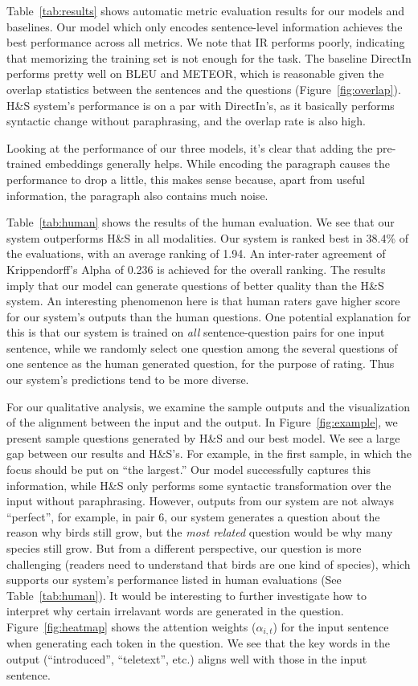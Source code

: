 \documentclass[11pt,a4paper]{article}
\begin{document}
Table~\ref{tab:results} shows automatic metric evaluation results for our models and baselines. Our model which only encodes sentence-level information achieves the best performance across all metrics. We note that IR performs poorly, indicating that memorizing the training set is not enough for the task. The baseline DirectIn performs pretty well on BLEU and METEOR, which is reasonable given the overlap statistics between the sentences and the questions (Figure~\ref{fig:overlap}). H\&S system's performance is on a par with DirectIn's, as it basically performs syntactic change without paraphrasing, and the overlap rate is also  high.

Looking at the performance of our three models, it's clear that adding the pre-trained embeddings generally helps. While encoding the paragraph causes the performance to drop a little, this makes sense because, apart from useful information, the paragraph also contains much noise.

Table~\ref{tab:human} shows the results of the human evaluation. We see that our system outperforms H\&S in all modalities. Our system is ranked best in 38.4\% of the evaluations, with an average ranking of 1.94. An inter-rater agreement of Krippendorff's Alpha of 0.236 is achieved for the overall ranking. The results imply that our model can generate questions of better quality than the H\&S system. An interesting phenomenon here is that human raters gave higher score for our system's outputs than the human questions. One potential explanation for this is that our system is trained on {\em all} sentence-question pairs for one input sentence, while we randomly select one question among the several questions of one sentence as the human generated question, for the purpose of rating. Thus our system's predictions tend to be more diverse.

For our qualitative analysis, we examine the sample outputs and the visualization of the alignment between the input and the output. In Figure~\ref{fig:example}, we present sample questions generated by H\&S and our best model. We see a large gap between our results and H\&S's. For example, in the first sample, in which the focus should be put on ``the largest.'' Our model successfully captures this information, while H\&S only performs some syntactic transformation over the input without paraphrasing. However, outputs from our system are not always ``perfect'', for example, in pair 6, our system generates a question about the reason why birds still grow, but the \emph{most related} question would be why many species still grow. But from a different perspective, our question is more challenging (readers need to understand that birds are one kind of species), which supports our system's performance listed in human evaluations (See Table~\ref{tab:human}). It would be interesting to further investigate how to interpret why certain irrelavant words are generated in the question. Figure~\ref{fig:heatmap} shows the attention weights ($\alpha_{i,t}$) for the input sentence when generating each token in the question. We see that the key words in the output (``introduced'', ``teletext'', etc.) aligns well with those in the input sentence.
\end{document}
